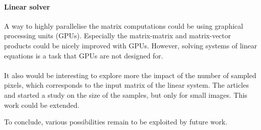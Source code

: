 \ifthesis
 \paragraph{Linear solver}
 A way to highly parallelise the matrix computations could be using graphical processing units (GPUs).
 Especially the matrix-matrix and matrix-vector products could be nicely improved with GPUs.
 However, solving systems of linear equations is a task that GPUs are not designed for.

 \paragraph{}
 It also would be interesting to explore more the impact of the number of sampled pixels, which corresponds to the input matrix of the linear system.
 The articles \cite{fowlkes_spectral_2004} and \cite{glide_2014} started a study on the size of the samples, but only for small images.
 This work could be extended.
\fi

To conclude, various possibilities remain to be exploited by future work.
